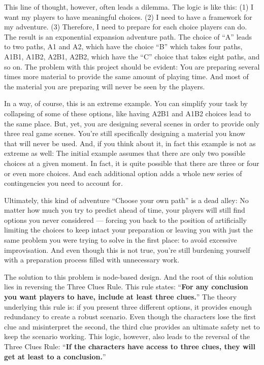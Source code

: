 \begin{multicols}{2}
This line of thought, however, often leads a dilemma. The logic is like this: (1) I want my players to have meaningful choices. (2) I need to have a framework for my adventure. (3) Therefore, I need to prepare for each choice players can do. The result is an exponential expansion adventure path. The choice of “A” leads to two paths, A1 and A2, which have the choice “B” which takes four paths, A1B1, A1B2, A2B1, A2B2, which have the “C” choice that takes eight paths, and so on. The problem with this project should be evident: You are preparing several times more material to provide the same amount of playing time. And most of the material you are preparing will never be seen by the players.

In a way, of course, this is an extreme example. You can simplify your task by collapsing of some of these options, like having A2B1 and A1B2 choices lead to the same place. But, yet, you are designing several scenes in order to provide only three real game scenes. You’re still specifically designing a material you know that will never be used. And, if you think about it, in fact this example is not as extreme as well: The initial example assumes that there are only two possible choices at a given moment. In fact, it is quite possible that there are three or four or even more choices. And each additional option adds a whole new series of contingencies you need to account for.

Ultimately, this kind of adventure “Choose your own path” is a dead alley: No matter how much you try to predict ahead of time, your players will still find options you never considered --- forcing you back to the position of artificially limiting the choices to keep intact your preparation or leaving you with just the same problem you were trying to solve in the first place: to avoid excessive improvisation. And even though this is not true, you're still burdening yourself with a preparation process filled with unnecessary work.

The solution to this problem is node-based design. And the root of this solution lies in reversing the Three Clues Rule. This rule states: “\textbf{For any conclusion you want players to have, include at least three clues.}” The theory underlying this rule is: if you present three different options, it provides enough redundancy to create a robust scenario. Even though the characters lose the first clue and misinterpret the second, the third clue provides an ultimate safety net to keep the scenario working. This logic, however, also leads to the reversal of the Three Clues Rule: “\textbf{If the characters have access to three clues, they will get at least to a conclusion.}”


\end{multicols}
